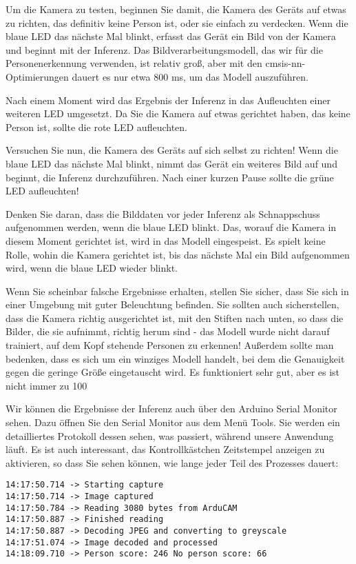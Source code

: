 Um die Kamera zu testen, beginnen Sie damit, die Kamera des Geräts auf etwas zu richten, das definitiv keine Person ist, oder sie einfach zu verdecken. Wenn die blaue LED das nächste Mal blinkt, erfasst das Gerät ein Bild von der Kamera und beginnt mit der Inferenz. Das Bildverarbeitungsmodell, das wir für die Personenerkennung verwenden, ist relativ groß, aber mit den cmsis-nn-Optimierungen dauert es nur etwa 800 ms, um das Modell auszuführen.

Nach einem Moment wird das Ergebnis der Inferenz in das Aufleuchten einer weiteren LED umgesetzt. Da Sie die Kamera auf etwas gerichtet haben, das keine Person ist, sollte die rote LED aufleuchten.

Versuchen Sie nun, die Kamera des Geräts auf sich selbst zu richten! Wenn die blaue LED das nächste Mal blinkt, nimmt das Gerät ein weiteres Bild auf und beginnt, die Inferenz durchzuführen. Nach einer kurzen Pause sollte die grüne LED aufleuchten!

Denken Sie daran, dass die Bilddaten vor jeder Inferenz als Schnappschuss aufgenommen werden, wenn die blaue LED blinkt. Das, worauf die Kamera in diesem Moment gerichtet ist, wird in das Modell eingespeist. Es spielt keine Rolle, wohin die Kamera gerichtet ist, bis das nächste Mal ein Bild aufgenommen wird, wenn die blaue LED wieder blinkt.

Wenn Sie scheinbar falsche Ergebnisse erhalten, stellen Sie sicher, dass Sie sich in einer Umgebung mit guter Beleuchtung befinden. Sie sollten auch sicherstellen, dass die Kamera richtig ausgerichtet ist, mit den Stiften nach unten, so dass die Bilder, die sie aufnimmt, richtig herum sind - das Modell wurde nicht darauf trainiert, auf dem Kopf stehende Personen zu erkennen! Außerdem sollte man bedenken, dass es sich um ein winziges Modell handelt, bei dem die Genauigkeit gegen die geringe Größe eingetauscht wird. Es funktioniert sehr gut, aber es ist nicht immer zu 100 %

Wir können die Ergebnisse der Inferenz auch über den Arduino Serial Monitor sehen. Dazu öffnen Sie den Serial Monitor aus dem Menü Tools. Sie werden ein detailliertes Protokoll dessen sehen, was passiert, während unsere Anwendung läuft. Es ist auch interessant, das Kontrollkästchen Zeitstempel anzeigen zu aktivieren, so dass Sie sehen können, wie lange jeder Teil des Prozesses dauert:



\begin{code}
    \begin{lstlisting}
14:17:50.714 -> Starting capture
14:17:50.714 -> Image captured
14:17:50.784 -> Reading 3080 bytes from ArduCAM
14:17:50.887 -> Finished reading
14:17:50.887 -> Decoding JPEG and converting to greyscale
14:17:51.074 -> Image decoded and processed
14:18:09.710 -> Person score: 246 No person score: 66
  \end{lstlisting}
\end{code}


